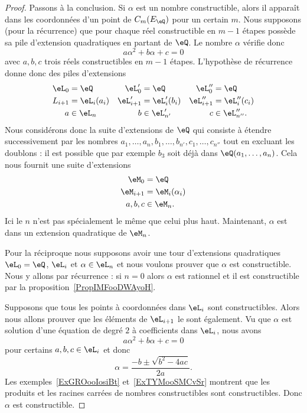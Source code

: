 \begin{proof}
    Passons à la conclusion. Si \( \alpha\) est un nombre constructible, alors il apparaît dans les coordonnées d'un point de \( C_m(E_{\eQ})\) pour un certain \( m\). Nous supposons (pour la récurrence) que pour chaque réel constructible en \( m-1\) étapes possède sa pile d'extension quadratiques en partant de \( \eQ\). Le nombre \( \alpha\) vérifie donc
    \begin{equation}
        a\alpha^2+b\alpha+c=0
    \end{equation}
    avec \( a,b,c\) trois réels constructibles en \( m-1\) étapes. L'hypothèse de récurrence donne donc des piles d'extensions
    \begin{equation}
        \begin{aligned}[]
            \eL_0&=\eQ&\eL'_0&=\eQ&\eL''_0&=\eQ\\
            L_{i+1}&=\eL_i(a_i)&\eL'_{i+1}&=\eL'_i(b_i)&\eL''_{i+1}&=\eL''_i(c_i)\\
            a&\in \eL_n&b&\in \eL'_{n'}&c&\in \eL''_{n''}.
        \end{aligned}
    \end{equation}
    Nous considérons donc la suite d'extensions de \( \eQ\) qui consiste à étendre successivement par les nombres \( a_1,\ldots, a_n,b_1,\ldots, b_{n'},c_1,\ldots, c_{n''}\) tout en excluant les doublons : il est possible que par exemple \( b_3\) soit déjà dans \( \eQ(a_1,\ldots, a_n)\). Cela nous fournit une suite d'extensions
    \begin{equation}
        \begin{aligned}[]
            \eM_0&=\eQ\\
            \eM_{i+1}&=\eM_i(\alpha_i)\\
            a,b,c&\in \eM_n.
        \end{aligned}
    \end{equation}
    Ici le \( n\) n'est pas spécialement le même que celui plus haut. Maintenant, \( \alpha\) est dans un extension quadratique de \( \eM_n\).

    Pour la réciproque nous supposons avoir une tour d'extensions quadratiques \( \eL_0=\eQ\), \( \eL_i\) et \( \alpha\in \eL_n\) et nous voulons prouver que \( \alpha\) est constructible. Nous y allons par récurrence : si \( n=0\) alors \( \alpha\) est rationnel et il est constructible par la proposition~\ref{PropIMFooDWAyoH}.

    Supposons que tous les points à coordonnées dans \( \eL_i\) sont constructibles. Alors nous allons prouver que les éléments de \( \eL_{i+1}\) le sont également. Vu que \( \alpha\) est solution d'une équation de degré \( 2\) à coefficients dans \( \eL_i\), nous avons
    \begin{equation}
        a\alpha^2+b\alpha+c=0
    \end{equation}
    pour certains \( a,b,c\in\eL_i\) et donc
    \begin{equation}
        \alpha=\frac{-b\pm\sqrt{b^2-4ac} }{ 2a }.
    \end{equation}
    Les exemples~\ref{ExGROooIosiBt} et~\ref{ExTYMooSMCvSr} montrent que les produits et les racines carrées de nombres constructibles sont constructibles. Donc \( \alpha\) est constructible.


\end{proof}
